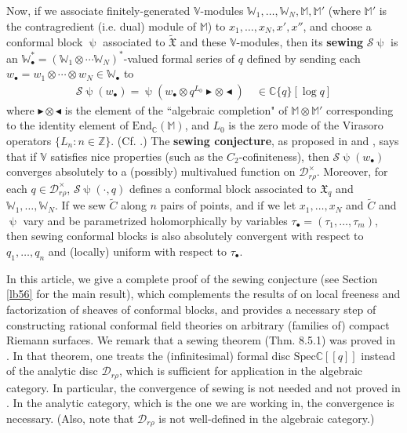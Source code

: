\documentclass[11pt,b5paper,notitlepage]{article}
\theoremstyle{definition}
\theoremstyle{plain}
\newcommand{\fk}{\mathfrak}
\newcommand{\mc}{\mathcal}
\newcommand{\wtd}{\widetilde}
\newcommand{\End}{\mathrm{End}} %
\newcommand{\mbb}{\mathbb}
\newcommand{\blt}{\bullet}
\newcommand{\Vbb}{\mathbb V}
\newcommand{\Wbb}{\mathbb W}
\newcommand{\Mbb}{\mathbb M}
\newcommand{\Cbb}{\mathbb C}
\newcommand{\Zbb}{\mathbb Z}
\newcommand{\btl}{\blacktriangleleft}
\newcommand{\btr}{\blacktriangleright}
\numberwithin{equation}{section}
\begin{document}
Now, if we associate finitely-generated $\Vbb$-modules $\Wbb_1,\dots,\Wbb_N,\Mbb,\Mbb'$ (where $\Mbb'$ is the contragredient (i.e. dual) module of $\Mbb$) to $x_1,\dots,x_N,x',x''$, and choose a conformal block $\uppsi$ associated to $\wtd{\fk X}$ and these $\Vbb$-modules, then its \textbf{sewing} $\mc S\uppsi$ is an $\Wbb_\blt^*=(\Wbb_1\otimes\cdots\Wbb_N)^*$-valued formal series of $q$ defined by sending each $w_\blt=w_1\otimes\cdots\otimes w_N\in\Wbb_\blt$ to
\begin{align*}
\mc S\uppsi(w_\blt)=\uppsi(w_\blt\otimes q^{L_0}\btr\otimes\btl)\quad\in\Cbb\{q\}[\log q]
\end{align*}
where $\btr\otimes\btl$ is the element of the ``algebraic completion" of $\Mbb\otimes\Mbb'$ corresponding to the identity element of $\End_\Cbb(\Mbb)$, and $L_0$ is the zero mode of the Virasoro operators $\{L_n:n\in\Zbb\}$. (Cf. \cite{Seg88,Vafa87,TUY89,Hua97a,DGT19b}.) The \textbf{sewing conjecture}, as proposed in \cite[Conj. 8.1]{Zhu94} and \cite[Problem 2.2]{Hua16}, says that if $\Vbb$ satisfies nice properties (such as the $C_2$-cofiniteness), then $\mc S\uppsi(w_\blt)$ converges absolutely to a (possibly) multivalued function on $\mc D_{r\rho}^\times$. Moreover, for each $q\in\mc D_{r\rho}^\times$, $\mc S\uppsi(\cdot,q)$ defines a conformal block associated to $\fk X_q$ and $\Wbb_1,\dots,\Wbb_N$. If we sew $\wtd C$ along $n$ pairs of points, and if we let  $x_1,\dots,x_N$ and  $\wtd C$ and $\uppsi$    vary and be parametrized holomorphically by variables $\tau_\blt=(\tau_1,\dots,\tau_m)$, then  sewing  conformal blocks is also absolutely  convergent with respect to $q_1,\dots,q_n$ and (locally) uniform with respect to $\tau_\blt$. 

In this article, we give a complete proof of the sewing conjecture (see Section \ref{lb56} for the main result), which complements the results of \cite{DGT19b} on local freeness and factorization of sheaves of conformal blocks, and provides a necessary step of constructing rational conformal field theories on arbitrary (families of) compact Riemann surfaces. We remark that a sewing theorem (Thm. 8.5.1) was proved in \cite{DGT19b}. In that theorem, one treats the (infinitesimal) formal disc $\mathrm{Spec}\mbb C[[q]]$ instead of the analytic disc $\mc D_{r\rho}$, which is sufficient for application  in the algebraic category.  In particular, the convergence of sewing is not needed and not proved in \cite{DGT19b}. In the analytic category, which is the one we are working in, the convergence is necessary. (Also, note  that $\mc D_{r\rho}$ is not well-defined in the algebraic category.) %
\end{document}
